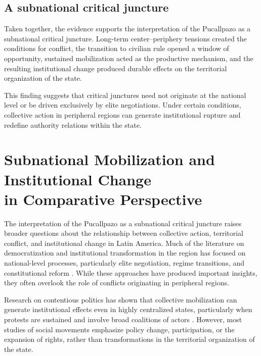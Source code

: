 \documentclass[12pt]{article}
\begin{document}
\subsection*{A subnational critical juncture}

Taken together, the evidence supports the interpretation of the
Pucallpazo as a subnational critical juncture. Long-term center--periphery
tensions created the conditions for conflict, the transition to civilian
rule opened a window of opportunity, sustained mobilization acted as the
productive mechanism, and the resulting institutional change produced
durable effects on the territorial organization of the state.

This finding suggests that critical junctures need not originate at the
national level or be driven exclusively by elite negotiations. Under
certain conditions, collective action in peripheral regions can generate
institutional rupture and redefine authority relations within the state.

\section{Subnational Mobilization and Institutional Change\\
in Comparative Perspective}

The interpretation of the Pucallpazo as a subnational critical juncture
raises broader questions about the relationship between collective action,
territorial conflict, and institutional change in Latin America. Much of
the literature on democratization and institutional transformation in the
region has focused on national-level processes, particularly elite
negotiation, regime transitions, and constitutional reform
\autocite{huntington_tercera_2002,bunce_rethinking_2003}. While these approaches have
produced important insights, they often overlook the role of conflicts
originating in peripheral regions.

Research on contentious politics has shown that collective mobilization
can generate institutional effects even in highly centralized states,
particularly when protests are sustained and involve broad coalitions of
actors \autocite{tilly_social_2004,abers_inventing_2000}. However, most studies of social
movements emphasize policy change, participation, or the expansion of
rights, rather than transformations in the territorial organization of
the state.
\end{document}
